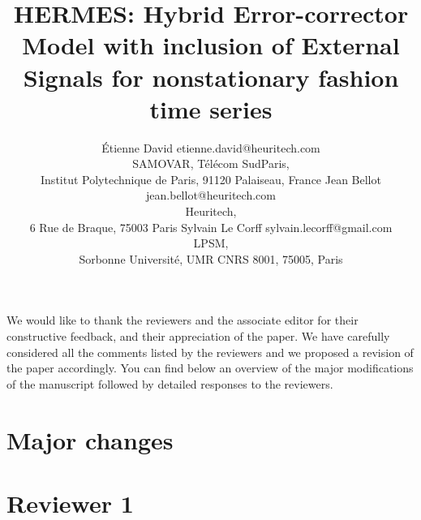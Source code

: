 \documentclass[10pt]{article} %
\title{HERMES: Hybrid Error-corrector Model with inclusion of External Signals for nonstationary fashion time series}
\author{\name \'Etienne David \email etienne.david@heuritech.com \\
      \addr SAMOVAR, Télécom SudParis,\\
      Institut Polytechnique de Paris, 91120 Palaiseau, France
      \AND
      \name Jean Bellot \email jean.bellot@heuritech.com \\
      \addr Heuritech, \\
      6 Rue de Braque, 75003 Paris
      \AND
      \name Sylvain Le Corff \email sylvain.lecorff@gmail.com\\
      \addr LPSM, \\
      Sorbonne Université, UMR CNRS 8001, 75005, Paris
      }
\begin{document}
\maketitle

We would like to thank the reviewers and the associate editor for their constructive feedback, and their appreciation of the paper. We have carefully considered all the comments listed by the reviewers and we proposed a revision of the paper accordingly. You can find below an overview of the major modifications of the manuscript followed by detailed responses to the reviewers.

\section*{Major changes}

\section*{Reviewer 1}
\end{document}
